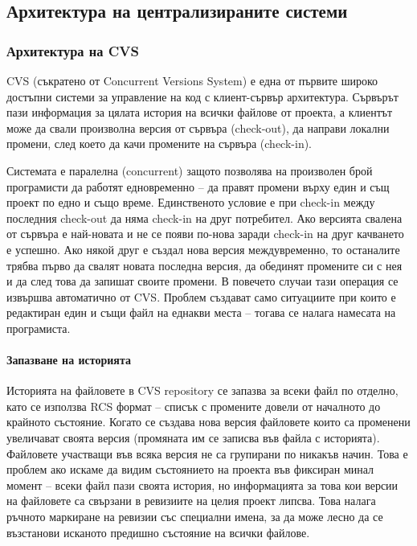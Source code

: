 \documentclass[a4paper]{article}
\begin{document}
  \subsection{Архитектура на централизираните системи}
    \subsubsection{Архитектура на CVS}

    CVS (съкратено от Concurrent Versions System) е една от първите широко
    достъпни системи за управление на код с клиент-сървър архитектура. Сървърът
    пази информация за цялата история на всички файлове от проекта, а клиентът
    може да свали произволна версия от сървъра (check-out), да направи локални
    промени, след което да качи промените на сървъра (check-in).

    Системата е паралелна (concurrent) защото позволява на произволен брой
    програмисти да работят едновременно -- да правят промени върху един
    и същ проект по едно и също време. Единственото условие е при check-in
    между последния check-out да няма check-in на друг потребител. Ако
    версията свалена от сървъра е най-новата и не се появи по-нова заради
    check-in на друг качването е успешно. Ако някой друг е създал нова
    версия междувременно, то останалите трябва първо да свалят новата последна
    версия, да обединят промените си с нея и да след това да запишат своите
    промени. В повечето случаи тази операция се извършва автоматично от CVS.
    Проблем създават само ситуациите при които е редактиран един и същи файл на
    еднакви места -- тогава се налага намесата на програмиста.

      \paragraph{Запазване на историята}

      Историята на файловете в CVS repository се запазва за всеки файл по
      отделно, като се използва RCS формат -- списък с промените довели от
      началното до крайното състояние. Когато се създава нова версия файловете
      които са променени увеличават своята версия (промяната им се записва
      във файла с историята). Файловете участващи във всяка версия не са
      групирани по никакъв начин. Това е проблем ако искаме да видим
      състоянието на проекта във фиксиран минал момент -- всеки файл пази
      своята история, но информацията за това кои версии на файловете са
      свързани в ревизиите на целия проект липсва. Това налага ръчното
      маркиране на ревизии със специални имена, за да може лесно да се
      възстанови исканото предишно състояние на всички файлове.
\end{document}
